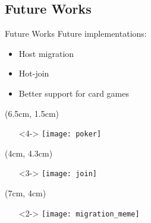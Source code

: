 \subsection{Future Works}
\begin{frame}{Future Works}
  Future implementations:
  \begin{itemize}
   \item<2-> Host migration
   \item<3-> Hot-join
   \item<4-> Better support for card games
  \end{itemize}
  
  \begin{textblock*}{5cm}(6.5cm, 1.5cm)
   \begin{itemize}
    \item[]<4-> \texttt{[image: poker]}
   \end{itemize}
  \end{textblock*}
  
  \begin{textblock*}{5cm}(4cm, 4.3cm)
   \begin{itemize}
    \item[]<3-> \texttt{[image: join]}
   \end{itemize}
  \end{textblock*}

  \begin{textblock*}{5cm}(7cm, 4cm)
   \begin{itemize}
    \item[]<2-> \texttt{[image: migration\_meme]}
   \end{itemize}

  \end{textblock*}



\end{frame}
